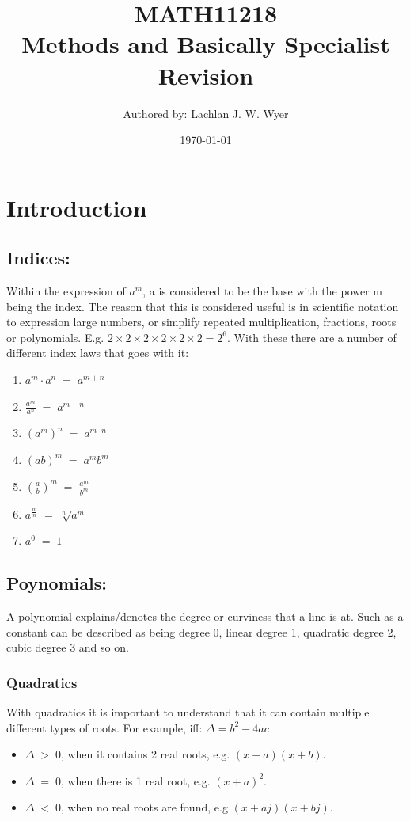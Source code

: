 \documentclass[a5paper]{article}
\title{MATH11218 \\ Methods and Basically Specialist Revision}
\author{Authored by: Lachlan J. W. Wyer}
\date{\today}
\begin{document}
	\maketitle
	\pagebreak
	\tableofcontents
	\pagebreak
	\raggedright

	\section{Introduction}
	\subsection{Indices:}
	Within the expression of $a^{m}$, a is considered to be the base with the power m being the index. The reason that this is considered useful is in scientific notation to expression large numbers, or simplify repeated multiplication, fractions, roots or polynomials. E.g. $2\times 2\times 2\times 2\times 2\times 2=2^{6}$. With these there are a number of different index laws that goes with it:
	\begin{enumerate}
		\item $a^{m}\cdot a^{n}\;=\;a^{m+n}$
		\item $\frac{a^{m}}{a^{n}}\;=\;a^{m-n}$
		\item $(a^{m})^{n}\;=\;a^{m\cdot n}$
		\item $(ab)^{m}\;=\;a^{m}b^{m}$
		\item $(\frac{a}{b})^{m}\;=\;\frac{a^{m}}{b^{m}}$
		\item $a^{\frac{m}{n}}\;=\;\sqrt[n]{a^{m}}$
		\item $a^{0}\;=\;1$
	\end{enumerate}

	\subsection{Poynomials:}
	A polynomial explains/denotes the degree or curviness that a line is at. Such as a constant can be described as being degree 0, linear degree 1, quadratic degree 2, cubic degree 3 and  so on.
	\subsubsection{Quadratics}
	With quadratics it is important to understand that it can contain multiple different types of roots. For example, iff: $\Delta=b^{2}-4ac$
	\begin{itemize}
		\item $\Delta\;>\;0$, when it contains 2 real roots, e.g. $(x+a)(x+b)$.
		\item $\Delta\;=\;0$, when there is 1 real root, e.g. $(x+a)^{2}$.
		\item $\Delta\;<\;0$, when no real roots are found, e.g $(x+aj)(x+bj)$.
	\end{itemize}
\end{document}
